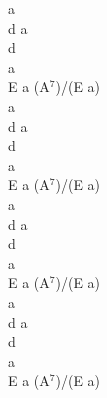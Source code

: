 \documentclass[a5paper, 10pt]{book}
\begin{document}
\begin{minipage}[b]{0.2\textwidth}
a\\
d a\\
d\\
a\\
E a (A$^7$)/(E a)\\

a\\
d a\\
d\\
a\\
E a (A$^7$)/(E a)\\

a\\
d a\\
d\\
a\\
E a (A$^7$)/(E a)\\

a\\
d a\\
d\\
a\\
E a (A$^7$)/(E a)\\
\end{minipage}

\newpage
\end{document}

